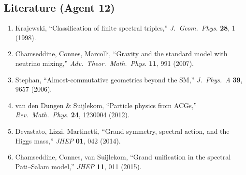 \documentclass[11pt,a4paper]{article}
\begin{document}
\subsection{Literature (Agent 12)}

\begin{enumerate}
\item Krajewski, ``Classification of finite spectral triples,'' \textit{J.\ Geom.\ Phys.} \textbf{28}, 1 (1998).
\item Chamseddine, Connes, Marcolli, ``Gravity and the standard model with neutrino mixing,'' \textit{Adv.\ Theor.\ Math.\ Phys.} \textbf{11}, 991 (2007).
\item Stephan, ``Almost-commutative geometries beyond the SM,'' \textit{J.\ Phys.\ A} \textbf{39}, 9657 (2006).
\item van den Dungen \& Suijlekom, ``Particle physics from ACGs,'' \textit{Rev.\ Math.\ Phys.} \textbf{24}, 1230004 (2012).
\item Devastato, Lizzi, Martinetti, ``Grand symmetry, spectral action, and the Higgs mass,'' \textit{JHEP} \textbf{01}, 042 (2014).
\item Chamseddine, Connes, van Suijlekom, ``Grand unification in the spectral Pati--Salam model,'' \textit{JHEP} \textbf{11}, 011 (2015).
\end{enumerate}
\end{document}
